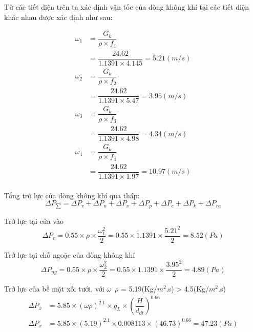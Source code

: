 Từ các tiết diện trên ta xác định vận tốc của dòng không khí tại các tiết diện khác nhau được xác định như sau:

\begin{equation*}
	\begin{split}
		\omega_{1}& = \dfrac{G_{k}}{\rho \times f_{1}}\\ 
				  & = \dfrac{24.62}{1.1391 \times 4.145 } = 5.21(m/s)\\
		\omega_{2}& = \dfrac{G_{k}}{\rho \times f_{2}}\\ 
		& = \dfrac{24.62}{1.1391 \times 5.47 } = 3.95(m/s)\\
		\omega_{3}& = \dfrac{G_{k}}{\rho \times f_{3}}\\ 
		& = \dfrac{24.62}{1.1391 \times 4.98 } = 4.34(m/s)\\
		\omega_{4}& = \dfrac{G_{k}}{\rho \times f_{4}}\\ 
		& = \dfrac{24.62}{1.1391 \times 1.97 } = 10.97(m/s)\\
	\end{split}
\end{equation*}

Tổng trở lực của dòng không khí qua tháp:
\begin{equation*}
	\Delta P_{\sum} = \Delta P_{v} +\Delta P_{n} + \Delta P_{x} + \Delta P_{p} +\Delta P_{e} + \Delta P_{k} + \Delta P_{ra}
\end{equation*}

Trở lực tại cửa vào
\begin{equation*}
	\Delta P_{v} = 0.55 \times \rho \times \dfrac{\omega_{1}^{2}}{2} = 0.55 \times 1.1391 \times \dfrac{5.21^2}{2} = 8.52(Pa)
\end{equation*}

Trở lực tại chỗ ngoặc của dòng không khí
\begin{equation*}
	\Delta P_{ng} = 0.55 \times \rho \times \dfrac{\omega_{2}^{2}}{2} = 0.55 \times 1.1391 \times \dfrac{3.95^2}{2} = 4.89(Pa)
\end{equation*}

Trở lực của bề mặt xối tưới, với $\omega$\ $\rho$ = 5.19(Kg/$m^2$.s) > 4.5(Kg/$m^2$.s)
\begin{equation*}
	\begin{split}
		\Delta P_{x} &= 5.85 \times (\omega \rho)^{2.1}  \times g_{L} \times  (\dfrac{H}{d_{dt}})^{0.66}\\
		\Delta P_{x} &= 5.85 \times (5.19)^{2.1} \times 0.008113 \times (46.73)^{0.66} = 47.23(Pa)
	\end{split}
\end{equation*}

